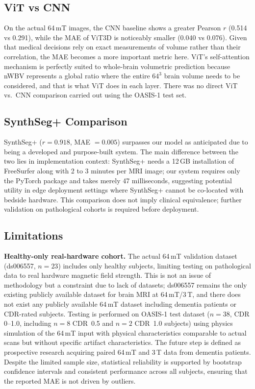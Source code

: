 \documentclass[12pt,a4paper]{article}
\begin{document}
\subsection{ViT vs CNN}

On the actual 64\,mT images, the CNN baseline shows a greater Pearson $r$
(0.514 vs 0.291), while the MAE of ViT3D is noticeably smaller (0.040 vs
0.076). Given that medical decisions rely on exact measurements of volume
rather than their correlation, the MAE becomes a more important metric here.
ViT's self-attention mechanism is perfectly suited to whole-brain volumetric
prediction because nWBV represents a global ratio where the entire $64^3$
brain volume needs to be considered, and that is what ViT does in each layer.
There was no direct ViT vs.\ CNN comparison carried out using the OASIS-1 test
set.

\subsection{SynthSeg+ Comparison}

SynthSeg+ ($r = 0.918$, MAE $= 0.005$) surpasses our model as anticipated due
to being a developed and purpose-built system. The main difference between the
two lies in implementation context: SynthSeg+ needs a 12\,GB installation of
FreeSurfer along with 2 to 3 minutes per MRI image; our system requires only
the PyTorch package and takes merely 47 milliseconds, suggesting potential
utility in edge deployment settings where SynthSeg+ cannot be co-located with
bedside hardware. This comparison does not imply clinical equivalence;
further validation on pathological cohorts is required before deployment.

\subsection{Limitations}
\label{sec:limitations}

\textbf{Healthy-only real-hardware cohort.}
The actual 64\,mT validation dataset (ds006557, $n = 23$) includes only
healthy subjects, limiting testing on pathological data to real hardware
magnetic field strength. This is not an issue of methodology but a constraint
due to lack of datasets; ds006557 remains the only existing publicly available
dataset for brain MRI at 64\,mT/3\,T, and there does not exist any publicly
available 64\,mT dataset including dementia patients or CDR-rated subjects.
Testing is performed on OASIS-1 test dataset ($n = 38$, CDR 0--1.0, including
$n = 8$ CDR~0.5 and $n = 2$ CDR~1.0 subjects) using physics simulation of
the 64\,mT input with physical characteristics comparable to actual scans but
without specific artifact characteristics. The future step is defined as
prospective research acquiring paired 64\,mT and 3\,T data from dementia
patients. Despite the limited sample size, statistical reliability is
supported by bootstrap confidence intervals and consistent performance
across all subjects, ensuring that the reported MAE is not driven by
outliers.
\end{document}
